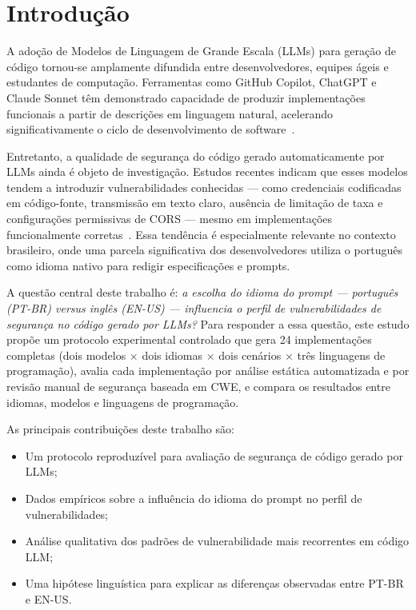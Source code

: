 \documentclass[12pt]{article}
\begin{document}
\section{Introdução}

A adoção de Modelos de Linguagem de Grande Escala (LLMs) para geração de código tornou-se amplamente difundida entre desenvolvedores, equipes ágeis e estudantes de computação. Ferramentas como GitHub Copilot, ChatGPT e Claude Sonnet têm demonstrado capacidade de produzir implementações funcionais a partir de descrições em linguagem natural, acelerando significativamente o ciclo de desenvolvimento de software~\cite{pearce2022asleep}.

Entretanto, a qualidade de segurança do código gerado automaticamente por LLMs ainda é objeto de investigação. Estudos recentes indicam que esses modelos tendem a introduzir vulnerabilidades conhecidas — como credenciais codificadas em código-fonte, transmissão em texto claro, ausência de limitação de taxa e configurações permissivas de CORS — mesmo em implementações funcionalmente corretas~\cite{pearce2022asleep,khoury2023secure}. Essa tendência é especialmente relevante no contexto brasileiro, onde uma parcela significativa dos desenvolvedores utiliza o português como idioma nativo para redigir especificações e prompts.

A questão central deste trabalho é: \textit{a escolha do idioma do prompt — português (PT-BR) versus inglês (EN-US) — influencia o perfil de vulnerabilidades de segurança no código gerado por LLMs?} Para responder a essa questão, este estudo propõe um protocolo experimental controlado que gera 24 implementações completas (dois modelos $\times$ dois idiomas $\times$ dois cenários $\times$ três linguagens de programação), avalia cada implementação por análise estática automatizada e por revisão manual de segurança baseada em CWE, e compara os resultados entre idiomas, modelos e linguagens de programação.

As principais contribuições deste trabalho são:
\begin{itemize}
  \item Um protocolo reproduzível para avaliação de segurança de código gerado por LLMs;
  \item Dados empíricos sobre a influência do idioma do prompt no perfil de vulnerabilidades;
  \item Análise qualitativa dos padrões de vulnerabilidade mais recorrentes em código LLM;
  \item Uma hipótese linguística para explicar as diferenças observadas entre PT-BR e EN-US.
\end{itemize}
\end{document}

